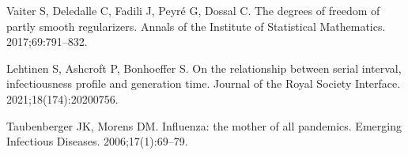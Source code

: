 \documentclass[10pt,letterpaper]{article}
\begin{document}
\begin{thebibliography}{10}
  Vaiter S, Deledalle C, Fadili J, Peyr{\'e} G, Dossal C.
  \newblock The degrees of freedom of partly smooth regularizers.
  \newblock Annals of the Institute of Statistical Mathematics. 2017;69:791--832.
  
  Lehtinen S, Ashcroft P, Bonhoeffer S.
  \newblock On the relationship between serial interval, infectiousness profile
    and generation time.
  \newblock Journal of the Royal Society Interface. 2021;18(174):20200756.
  
  Taubenberger JK, Morens DM.
   {I}nfluenza: the mother of all pandemics.
  \newblock Emerging Infectious Diseases. 2006;17(1):69--79.
  
\end{thebibliography}


\end{document}
